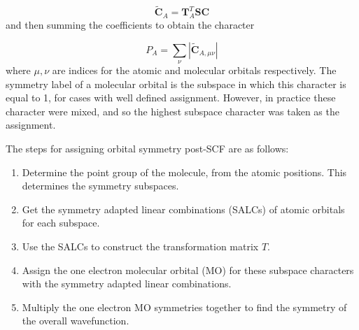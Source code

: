 \begin{equation}
\tilde{\mathbf{C}}_A = \mathbf{T}^T_A \mathbf{S} \mathbf{C}
\end{equation}
%
and then summing the coefficients to obtain the character

\begin{equation}
P_A = \sum_{\nu} \left\lvert \tilde{\mathbf{C}}_{A, \mu\nu} \right\rvert
\end{equation}
%
where $\mu,\nu$ are indices for the atomic and molecular orbitals respectively. 
The symmetry label of a molecular orbital is the subspace in which this character 
is equal to 1, for cases with well defined assignment. However, in practice these
character were mixed, and so the highest subspace character was taken as the assignment.

The steps for assigning orbital symmetry post-SCF are as follows:

\begin{enumerate}
    \item Determine the point group of the molecule, from the atomic positions. This
    determines the symmetry subspaces.
    \item Get the symmetry adapted linear combinations (SALCs) of atomic orbitals for 
    each subspace.
    \item Use the SALCs to construct the transformation matrix $T$.
    \item Assign the one electron molecular orbital (MO) for these subspace characters
     with the symmetry adapted linear combinations.
    \item Multiply the one electron MO symmetries together to find the symmetry 
    of the overall wavefunction.
\end{enumerate}

